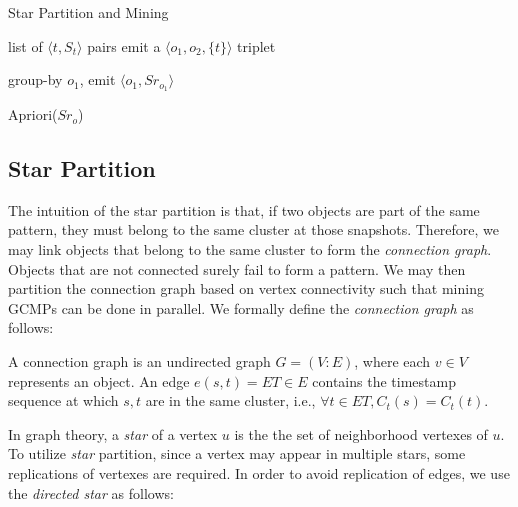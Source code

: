 \begin{algorithm}
\caption{Star Partition and Mining}
\label{algo:spm_overview}
\begin{algorithmic}[1]
\Require list of $\langle t, S_t \rangle$ pairs
\label{code:spm-map-start}
		  \label{code:spm-edge-direct}
			\State emit a $\langle o_1, o_2, \{t\}\rangle$ triplet
		\EndIf
	\EndFor
\EndFor
\label{code:spm-map-end}

\label{code:spm-shuffle-start}
	\State group-by $o_1$, emit $\langle o_1, Sr_{o_1} \rangle$ 
\EndFor
\label{code:spm-shuffle-end}

\label{code:spm-reduce-start}
\State Apriori($Sr_o$)
\EndFor
\label{code:spm-reduce-end}

\end{algorithmic}
\end{algorithm}

\subsection{Star Partition}
The intuition of the star partition is that, if two objects are part 
of the same pattern, they must belong to the same cluster at 
those snapshots. Therefore, we may link objects that belong to 
the same cluster to form the \emph{connection graph}. Objects that are
not connected surely fail to form a pattern. We may then
partition the connection graph based on vertex connectivity
such that mining GCMPs can be done in parallel. 
We formally define the \emph{connection graph} as follows:
\begin{definition}
A connection graph is an undirected graph $G=(V:E)$, where 
each $v \in V$ represents an object. An edge $e(s,t)= ET \in E$ 
contains the timestamp sequence at which $s,t$ are in the same cluster,
i.e., $\forall t \in ET, C_t(s) = C_t(t)$. 
\end{definition}

In graph theory, a \emph{star} of a vertex $u$ is the
the set of neighborhood vertexes of $u$. To utilize \emph{star}
partition, since a vertex may appear in multiple stars, 
some replications of vertexes are required. In order to avoid replication 
of edges, we use the \emph{directed star} as follows:

